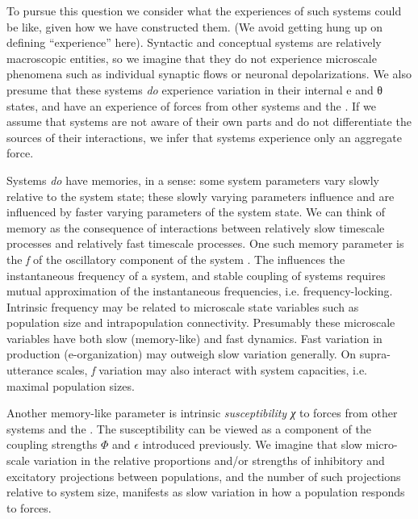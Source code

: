   To pursue this question we consider what the experiences of such systems could be like, given how we have constructed them. (We avoid getting hung up on defining “experience” here). Syntactic and conceptual systems are relatively macroscopic entities, so we imagine that they do not experience microscale phenomena such as individual synaptic flows or neuronal depolarizations. We also presume that these systems \textit{do} experience variation in their internal e and θ states, and have an experience of forces from other systems and the . If we assume that systems are not aware of their own parts and do not differentiate the sources of their interactions, we infer that systems experience only an aggregate force. 

  Systems \textit{do} have memories, in a sense: some system parameters vary slowly relative to the system state; these slowly varying parameters influence and are influenced by faster varying parameters of the system state. We can think of memory as the consequence of interactions between relatively slow timescale processes and relatively fast timescale processes. One such memory parameter is the  \textit{f} of the oscillatory component of the system . The  influences the instantaneous frequency of a system, and stable coupling of systems requires mutual approximation of the instantaneous frequencies, i.e. frequency-locking. Intrinsic frequency may be related to microscale state variables such as population size and intrapopulation connectivity. Presumably these microscale variables have both slow (memory-like) and fast dynamics. Fast variation in production (e-organization) may outweigh slow variation generally. On supra-utterance scales, \textit{f} variation may also interact with system capacities, i.e. maximal population sizes. 

  Another memory-like parameter is intrinsic \textit{susceptibility χ} to forces from other systems and the . The susceptibility can be viewed as a component of the coupling strengths $\Phi$ and $\epsilon$ introduced previously. We imagine that slow micro-scale variation in the relative proportions and/or strengths of inhibitory and excitatory projections between populations, and the number of such projections relative to system size, manifests as slow variation in how a population responds to forces.


